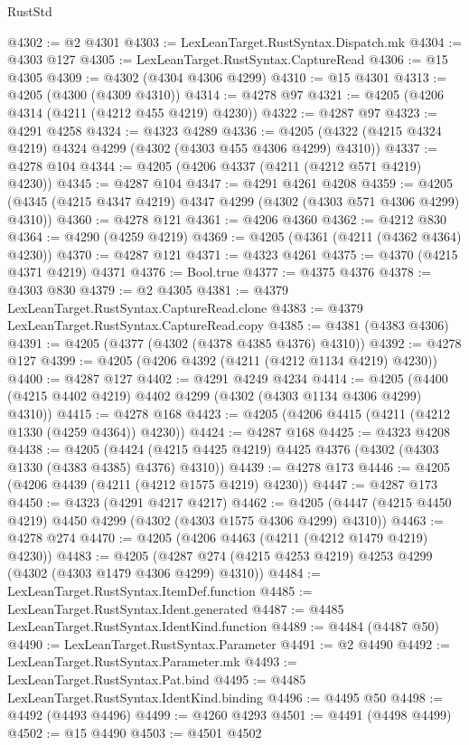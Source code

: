 \begin{lexlean}{RustStd}
\begin{coremodule}
@4302 := @2 @4301
@4303 := LexLeanTarget.RustSyntax.Dispatch.mk
@4304 := @4303 @127
@4305 := LexLeanTarget.RustSyntax.CaptureRead
@4306 := @15 @4305
@4309 := @4302 (@4304 @4306 @4299)
@4310 := @15 @4301
@4313 := @4205 (@4300 (@4309 @4310))
@4314 := @4278 @97
@4321 := @4205 (@4206 @4314 (@4211 (@4212 @455 @4219) @4230))
@4322 := @4287 @97
@4323 := @4291 @4258
@4324 := @4323 @4289
@4336 := @4205 (@4322 (@4215 @4324 @4219) @4324 @4299 (@4302 (@4303 @455 @4306 @4299) @4310))
@4337 := @4278 @104
@4344 := @4205 (@4206 @4337 (@4211 (@4212 @571 @4219) @4230))
@4345 := @4287 @104
@4347 := @4291 @4261 @4208
@4359 := @4205 (@4345 (@4215 @4347 @4219) @4347 @4299 (@4302 (@4303 @571 @4306 @4299) @4310))
@4360 := @4278 @121
@4361 := @4206 @4360
@4362 := @4212 @830
@4364 := @4290 (@4259 @4219)
@4369 := @4205 (@4361 (@4211 (@4362 @4364) @4230))
@4370 := @4287 @121
@4371 := @4323 @4261
@4375 := @4370 (@4215 @4371 @4219) @4371
@4376 := Bool.true
@4377 := @4375 @4376
@4378 := @4303 @830
@4379 := @2 @4305
@4381 := @4379 LexLeanTarget.RustSyntax.CaptureRead.clone
@4383 := @4379 LexLeanTarget.RustSyntax.CaptureRead.copy
@4385 := @4381 (@4383 @4306)
@4391 := @4205 (@4377 (@4302 (@4378 @4385 @4376) @4310))
@4392 := @4278 @127
@4399 := @4205 (@4206 @4392 (@4211 (@4212 @1134 @4219) @4230))
@4400 := @4287 @127
@4402 := @4291 @4249 @4234
@4414 := @4205 (@4400 (@4215 @4402 @4219) @4402 @4299 (@4302 (@4303 @1134 @4306 @4299) @4310))
@4415 := @4278 @168
@4423 := @4205 (@4206 @4415 (@4211 (@4212 @1330 (@4259 @4364)) @4230))
@4424 := @4287 @168
@4425 := @4323 @4208
@4438 := @4205
    (@4424 (@4215 @4425 @4219) @4425 @4376 (@4302 (@4303 @1330 (@4383 @4385) @4376) @4310))
@4439 := @4278 @173
@4446 := @4205 (@4206 @4439 (@4211 (@4212 @1575 @4219) @4230))
@4447 := @4287 @173
@4450 := @4323 (@4291 @4217 @4217)
@4462 := @4205 (@4447 (@4215 @4450 @4219) @4450 @4299 (@4302 (@4303 @1575 @4306 @4299) @4310))
@4463 := @4278 @274
@4470 := @4205 (@4206 @4463 (@4211 (@4212 @1479 @4219) @4230))
@4483 := @4205 (@4287 @274 (@4215 @4253 @4219) @4253 @4299 (@4302 (@4303 @1479 @4306 @4299) @4310))
@4484 := LexLeanTarget.RustSyntax.ItemDef.function
@4485 := LexLeanTarget.RustSyntax.Ident.generated
@4487 := @4485 LexLeanTarget.RustSyntax.IdentKind.function
@4489 := @4484 (@4487 @50)
@4490 := LexLeanTarget.RustSyntax.Parameter
@4491 := @2 @4490
@4492 := LexLeanTarget.RustSyntax.Parameter.mk
@4493 := LexLeanTarget.RustSyntax.Pat.bind
@4495 := @4485 LexLeanTarget.RustSyntax.IdentKind.binding
@4496 := @4495 @50
@4498 := @4492 (@4493 @4496)
@4499 := @4260 @4293
@4501 := @4491 (@4498 @4499)
@4502 := @15 @4490
@4503 := @4501 @4502

\end{coremodule}
\end{lexlean}
